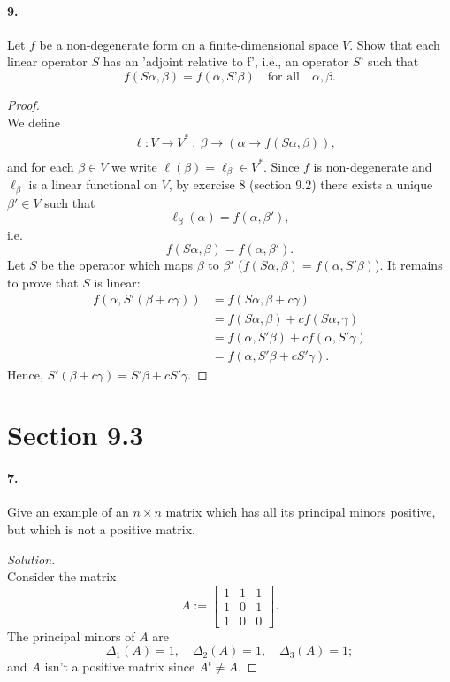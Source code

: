 \documentclass{article}
\theoremstyle{plain}
\theoremstyle{definition}
\theoremstyle{remark}
\begin{document}
    \paragraph{9.}
      Let $f$ be a non-degenerate form on a finite-dimensional space $V$. Show that each linear operator $S$ has an 'adjoint relative to f', i.e., an operator $S’$ such that
        $$f(S\alpha, \beta) = f(\alpha, S’\beta) \quad \text{for all} \quad \alpha,\beta.$$
      \begin{proof}$ $\\
        We define
        \begin{align*}
          &\ell : V \to V^* \ : \ \beta \to (\alpha \to f(S\alpha,\beta)),\\
        \end{align*}
        and for each $\beta\in V$ we write $\ell(\beta) = \ell_{\beta}\in V^*$. Since $f$ is non-degenerate and $\ell_{\beta}$ is a linear functional on $V$, by exercise 8 (section 9.2) there exists a unique $\beta'\in V$ such that
        $$\ell_{\beta} (\alpha) = f(\alpha,\beta'),$$
        i.e.
        $$f(S\alpha,\beta) = f(\alpha,\beta').$$
        Let $S$ be the operator which maps $\beta$ to $\beta'$ ($f(S\alpha,\beta) = f(\alpha,S'\beta)$). It remains to prove that $S$ is linear:
        \begin{align}
            f(\alpha,S'(\beta + c \gamma))  & = f (S \alpha, \beta +c \gamma)\\
                                            & = f (S \alpha,\beta) + cf(S\alpha,\gamma)\\
                                            & = f (\alpha,S'\beta) + cf(\alpha,S'\gamma)\\
                                            & = f(\alpha, S'\beta + cS'\gamma).
        \end{align}
        Hence, $S'(\beta + c \gamma)= S'\beta + cS'\gamma$.
      \end{proof}


  \section*{Section 9.3}

    \paragraph{7.}
      Give an example of an $n\times n$ matrix which has all its principal minors positive, but which is not a positive matrix.
      \begin{proof}[Solution]$ $\\
        Consider the matrix
        $$A := \begin{bmatrix}
                1 & 1 & 1 \\
                1 & 0 & 1 \\
                1 & 0 & 0
        \end{bmatrix}.$$
        The principal minors of $A$ are
        $$\Delta_1(A) = 1, \quad \Delta_2(A) = 1, \quad \Delta_3(A) = 1;$$
        and $A$ isn't a positive matrix since $A^t\neq A$.
      \end{proof}
\end{document}
